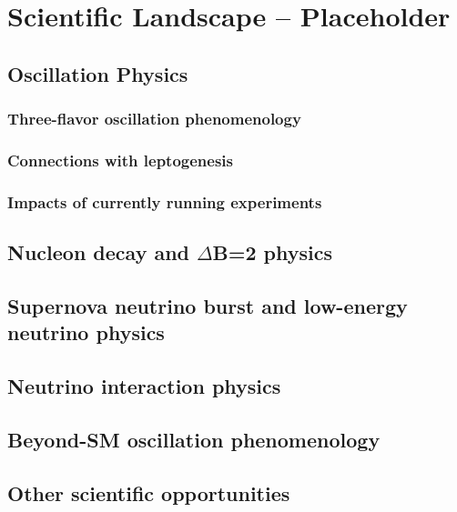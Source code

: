 \chapter{Scientific Landscape -- Placeholder}
\label{ch:physics-atmpdk}



\section{Oscillation Physics}
\label{sec:landscape-osc}

\subsection{Three-flavor oscillation phenomenology}
\label{sec:landscape-osc-3flavor}

\subsection{Connections with leptogenesis} 
\label{sec:landscape-osc-leptogen}


\subsection{Impacts of currently running experiments}
\label{sec:landscape-osc-impacts}


\section{Nucleon decay and $\Delta$B=2 physics}
\label{sec:landscape-ndk}


\section{Supernova neutrino burst and low-energy neutrino physics}
\label{sec:landscape-snb-lowe}


\section{Neutrino interaction physics}
\label{sec:landscape-nu-interaction}

\section{Beyond-SM oscillation phenomenology}
\label{sec:landscape-bsm}

\section{Other scientific opportunities}
\label{sec:landscape-addl}
